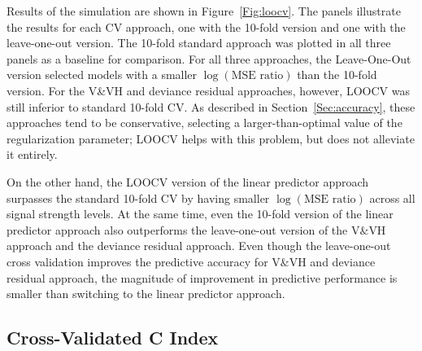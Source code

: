 Results of the simulation are shown in Figure~\ref{Fig:loocv}. The panels illustrate the results for each CV approach, one with the 10-fold version and one with the leave-one-out version. The 10-fold standard approach was plotted in all three panels as a baseline for comparison.  For all three approaches, the Leave-One-Out version selected models with a smaller $\log(\text{MSE ratio})$ than the 10-fold version. For the V\&VH and deviance residual approaches, however, LOOCV was still inferior to standard 10-fold CV.  As described in Section~\ref{Sec:accuracy}, these approaches tend to be conservative, selecting a larger-than-optimal value of the regularization parameter; LOOCV helps with this problem, but does not alleviate it entirely.

On the other hand, the LOOCV version of the linear predictor approach surpasses the standard 10-fold CV by having smaller $\log(\text{MSE ratio})$ across all signal strength levels. At the same time, even the 10-fold version of the linear predictor approach also outperforms the leave-one-out version of the V$\&$VH approach and the deviance residual approach. Even though the leave-one-out cross validation improves the predictive accuracy for V$\&$VH and deviance residual approach, the magnitude of improvement in predictive performance is smaller than switching to the linear predictor approach.

\subsection {Cross-Validated C Index}

